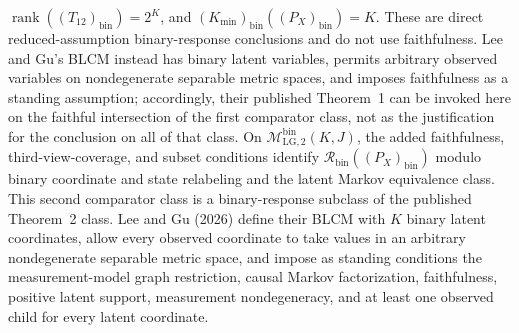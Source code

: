 \(\operatorname{rank}((T_{12})_{\mathrm{bin}})=2^K\), and
\((K_{\min})_{\mathrm{bin}}((P_X)_{\mathrm{bin}})=K\).  These are direct
reduced-assumption binary-response conclusions and do not use faithfulness.
Lee and Gu's BLCM instead has binary latent variables, permits arbitrary
observed variables on nondegenerate separable metric spaces, and imposes
faithfulness as a standing assumption; accordingly, their published
Theorem~1 can be invoked here on the faithful intersection of the first
comparator class, not as the justification for the conclusion on all of that
class.  On
\(\mathcal M_{\mathrm{LG},2}^{\mathrm{bin}}(K,J)\), the added faithfulness,
third-view-coverage, and subset conditions identify
\(\mathcal R_{\mathrm{bin}}((P_X)_{\mathrm{bin}})\) modulo binary coordinate
and state relabeling and the latent Markov equivalence class.  This second
comparator class is a binary-response subclass of the published Theorem~2
class.
Lee and Gu (2026) define their BLCM with \(K\) binary latent coordinates,
allow every observed coordinate to take values in an arbitrary nondegenerate
separable metric space, and impose as standing conditions the
measurement-model graph restriction, causal Markov factorization,
faithfulness, positive latent support, measurement nondegeneracy, and at
least one observed child for every latent coordinate.
